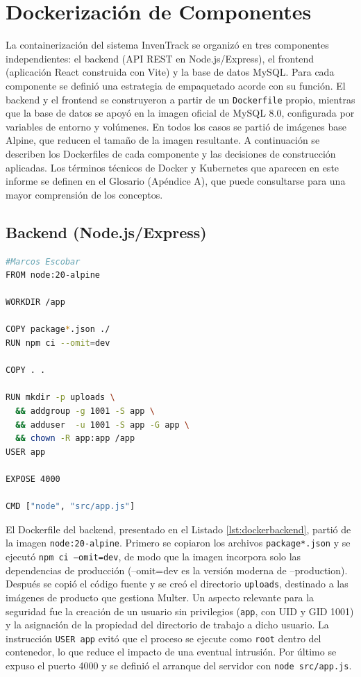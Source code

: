 \documentclass[stu,11pt,spanish,floatsintext]{apa7}
\begin{document}
\section{Dockerización de Componentes}

La containerización del sistema InvenTrack se organizó en tres componentes independientes: el backend (API REST en Node.js/Express), el frontend (aplicación React construida con Vite) y la base de datos MySQL. Para cada componente se definió una estrategia de empaquetado acorde con su función. El backend y el frontend se construyeron a partir de un \texttt{Dockerfile} propio, mientras que la base de datos se apoyó en la imagen oficial de MySQL 8.0, configurada por variables de entorno y volúmenes. En todos los casos se partió de imágenes base Alpine, que reducen el tamaño de la imagen resultante. A continuación se describen los Dockerfiles de cada componente y las decisiones de construcción aplicadas. Los términos técnicos de Docker y Kubernetes que aparecen en este informe se definen en el Glosario (Apéndice A), que puede consultarse para una mayor comprensión de los conceptos.

\subsection{Backend (Node.js/Express)}

\begin{lstlisting}[language=bash,caption={Dockerfile del Backend},label=lst:dockerbackend]
#Marcos Escobar
FROM node:20-alpine

WORKDIR /app

COPY package*.json ./
RUN npm ci --omit=dev

COPY . .

RUN mkdir -p uploads \
  && addgroup -g 1001 -S app \
  && adduser  -u 1001 -S app -G app \
  && chown -R app:app /app
USER app

EXPOSE 4000

CMD ["node", "src/app.js"]
\end{lstlisting}

El Dockerfile del backend, presentado en el Listado \ref{lst:dockerbackend}, partió de la imagen \texttt{node:20-alpine}. Primero se copiaron los archivos \texttt{package*.json} y se ejecutó \texttt{npm ci --omit=dev}, de modo que la imagen incorpora solo las dependencias de producción (--omit=dev es la versión moderna de --production). Después se copió el código fuente y se creó el directorio \texttt{uploads}, destinado a las imágenes de producto que gestiona Multer. Un aspecto relevante para la seguridad fue la creación de un usuario sin privilegios (\texttt{app}, con UID y GID 1001) y la asignación de la propiedad del directorio de trabajo a dicho usuario. La instrucción \texttt{USER app} evitó que el proceso se ejecute como \texttt{root} dentro del contenedor, lo que reduce el impacto de una eventual intrusión. Por último se expuso el puerto 4000 y se definió el arranque del servidor con \texttt{node src/app.js}.
\end{document}
